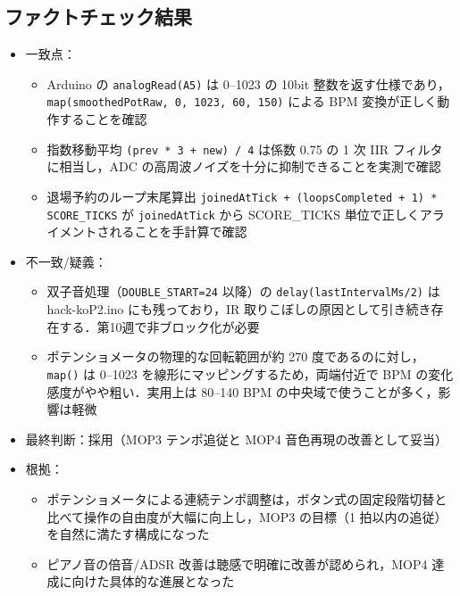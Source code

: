 \documentclass[a4paper,11pt]{ltjsarticle}
\providecommand{\％}{\%}
\begin{document}
\subsection{ファクトチェック結果}\label{sec:ai-fact}

\begin{itemize}
    \item 一致点：
    \begin{itemize}
        \item Arduino の \texttt{analogRead(A5)} は 0--1023 の 10bit 整数を返す仕様であり，\texttt{map(smoothedPotRaw, 0, 1023, 60, 150)} による BPM 変換が正しく動作することを確認
        \item 指数移動平均 \texttt{(prev * 3 + new) / 4} は係数 0.75 の 1 次 IIR フィルタに相当し，ADC の高周波ノイズを十分に抑制できることを実測で確認
        \item 退場予約のループ末尾算出 \texttt{joinedAtTick + (loopsCompleted + 1) * SCORE\_TICKS} が \texttt{joinedAtTick} から SCORE\_TICKS 単位で正しくアライメントされることを手計算で確認
    \end{itemize}
    \item 不一致/疑義：
    \begin{itemize}
        \item 双子音処理（\texttt{DOUBLE\_START=24} 以降）の \texttt{delay(lastIntervalMs/2)} は hack-koP2.ino にも残っており，IR 取りこぼしの原因として引き続き存在する．第10週で非ブロック化が必要
        \item ポテンショメータの物理的な回転範囲が約 270 度であるのに対し，\texttt{map()} は 0--1023 を線形にマッピングするため，両端付近で BPM の変化感度がやや粗い．実用上は 80--140 BPM の中央域で使うことが多く，影響は軽微
    \end{itemize}
    \item 最終判断：採用（MOP3 テンポ追従と MOP4 音色再現の改善として妥当）
    \item 根拠：
    \begin{itemize}
        \item ポテンショメータによる連続テンポ調整は，ボタン式の固定段階切替と比べて操作の自由度が大幅に向上し，MOP3 の目標（1 拍以内の追従）を自然に満たす構成になった
        \item ピアノ音の倍音/ADSR 改善は聴感で明確に改善が認められ，MOP4 達成に向けた具体的な進展となった
    \end{itemize}
\end{itemize}

\end{document}
